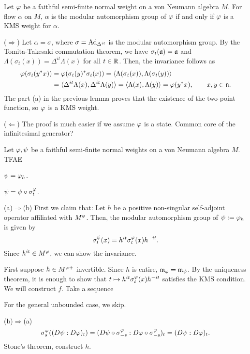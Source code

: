 \documentclass{../../small}
\begin{document}
\begin{prop}
Let $\varphi$ be a faithful semi-finite normal weight on a von Neumann algebra $M$.
For flow $\alpha$ on $M$, $\alpha$ is the modular automorphism group of $\varphi$ if and only if $\varphi$ is a KMS weight for $\alpha$.
\end{prop}
\begin{pf}
($\Rightarrow$)
Let $\alpha=\sigma$, where $\sigma=\operatorname{Ad}_{\Delta^{it}}$ is the modular automorphism group.
By the Tomita-Takesaki commutation theorem, we have $\sigma_t(\mathfrak{a})=\mathfrak{a}$ and $\Lambda(\sigma_t(x))=\Delta^{it}\Lambda(x)$ for all $t\in\mathbb{R}$.
Then, the invariance follows as
\begin{align*}
\varphi(\sigma_t(y^*x))&=\varphi(\sigma_t(y)^*\sigma_t(x))=\langle\Lambda(\sigma_t(x)),\Lambda(\sigma_t(y))\rangle\\
&=\langle\Delta^{it}\Lambda(x),\Delta^{it}\Lambda(y)\rangle=\langle\Lambda(x),\Lambda(y)\rangle=\varphi(y^*x),\qquad x,y\in\mathfrak{n}.
\end{align*}
The part (a) in the previous lemma proves that the existence of the two-point function, so $\varphi$ is a KMS weight.

($\Leftarrow$)
The proof is much easier if we assume $\varphi$ is a state.
Common core of the infinitesimal generator?
\end{pf}
\fi

\begin{thm}
Let $\varphi,\psi$ be a faithful semi-finite normal weights on a von Neumann algebra $M$.
TFAE
\begin{parts}
\item $\psi=\varphi_h$.
\item $\psi=\psi\circ\sigma_t^\varphi$.
\end{parts}
\end{thm}
\begin{pf}
(a)$\Rightarrow$(b)
First we claim that:
Let $h$ be a positive non-singular self-adjoint operator affiliated with $M^\varphi$.
Then, the modular automorphism group of $\psi:=\varphi_h$ is given by
\[\sigma_t^{\psi}(x)=h^{it}\sigma_t^\varphi(x)h^{-it}.\]
Since $h^{it}\in M^\varphi$, we can show the invariance.

First suppose $h\in M^{\varphi+}$ invertible.
Since $h$ is entire, $\mathfrak{m}_\varphi=\mathfrak{m}_\psi$.
By the uniqueness theorem, it is enough to show that $t\mapsto h^{it}\sigma_t^\varphi(x)h^{-it}$ satisfies the KMS condition.
We will construct $f$.
Take a sequence 

For the general unbounded case, we skip.

(b)$\Rightarrow$(a)
\[\sigma_s^\varphi((D\psi:D\varphi)_t)=(D\psi\circ\sigma_{-s}^\varphi:D\varphi\circ\sigma_{-s}^\varphi)_t=(D\psi:D\varphi)_t.\]
Stone's theorem, construct $h$.

\end{pf}
\end{document}
